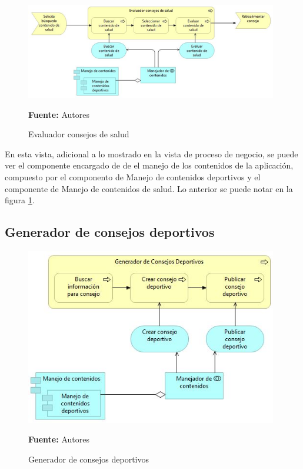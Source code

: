 \begin{figure}[!htb]
  \begin{center}
    \includegraphics[width=11cm]{./imagenes/Archimate/vistas/application_usage/evaluadorconsejossalud.png}
    \caption{Evaluador consejos de salud}
    \label{fig:BP_EvaluadorConsejosSalud}
    \textbf{Fuente:}  Autores \\
  \end{center}
\end{figure}

En esta vista, adicional a lo mostrado en la vista de proceso de negocio, se puede ver el componente encargado de de el manejo de los contenidos de la aplicación, compuesto por el componento de Manejo de contenidos deportivos y el componente de Manejo de contenidos de salud. Lo anterior se puede notar en la figura \ref{fig:BP_EvaluadorConsejosSalud}.

\subsection{Generador de consejos deportivos}

\begin{figure}[!htb]
  \begin{center}
    \includegraphics[width=11cm]{./imagenes/Archimate/vistas/application_usage/generadorconsejosdeportivos.png}
    \caption{Generador de consejos deportivos}
    \label{fig:BP_GeneradorConsejosDeportivos}
    \textbf{Fuente:}  Autores \\
  \end{center}
\end{figure}

